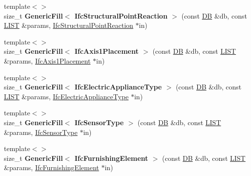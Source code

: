 \begin{DoxyCompactItemize}
\item 
\hypertarget{namespace_assimp_1_1_s_t_e_p_ac2d138adfe91c8481dff5e7fff17ab69}{{\footnotesize template$<$$>$ }\\size\+\_\+t {\bfseries Generic\+Fill$<$ Ifc\+Structural\+Point\+Reaction $>$} (const \hyperlink{class_assimp_1_1_s_t_e_p_1_1_d_b}{D\+B} \&db, const \hyperlink{class_assimp_1_1_s_t_e_p_1_1_e_x_p_r_e_s_s_1_1_l_i_s_t}{L\+I\+S\+T} \&params, \hyperlink{struct_assimp_1_1_i_f_c_1_1_ifc_structural_point_reaction}{Ifc\+Structural\+Point\+Reaction} $\ast$in)}\label{namespace_assimp_1_1_s_t_e_p_ac2d138adfe91c8481dff5e7fff17ab69}

\item 
\hypertarget{namespace_assimp_1_1_s_t_e_p_ad51557042bd1aa5856e1bd68b151a7d5}{{\footnotesize template$<$$>$ }\\size\+\_\+t {\bfseries Generic\+Fill$<$ Ifc\+Axis1\+Placement $>$} (const \hyperlink{class_assimp_1_1_s_t_e_p_1_1_d_b}{D\+B} \&db, const \hyperlink{class_assimp_1_1_s_t_e_p_1_1_e_x_p_r_e_s_s_1_1_l_i_s_t}{L\+I\+S\+T} \&params, \hyperlink{struct_assimp_1_1_i_f_c_1_1_ifc_axis1_placement}{Ifc\+Axis1\+Placement} $\ast$in)}\label{namespace_assimp_1_1_s_t_e_p_ad51557042bd1aa5856e1bd68b151a7d5}

\item 
\hypertarget{namespace_assimp_1_1_s_t_e_p_aefa592f99f3422c9de8582305367f70a}{{\footnotesize template$<$$>$ }\\size\+\_\+t {\bfseries Generic\+Fill$<$ Ifc\+Electric\+Appliance\+Type $>$} (const \hyperlink{class_assimp_1_1_s_t_e_p_1_1_d_b}{D\+B} \&db, const \hyperlink{class_assimp_1_1_s_t_e_p_1_1_e_x_p_r_e_s_s_1_1_l_i_s_t}{L\+I\+S\+T} \&params, \hyperlink{struct_assimp_1_1_i_f_c_1_1_ifc_electric_appliance_type}{Ifc\+Electric\+Appliance\+Type} $\ast$in)}\label{namespace_assimp_1_1_s_t_e_p_aefa592f99f3422c9de8582305367f70a}

\item 
\hypertarget{namespace_assimp_1_1_s_t_e_p_aa62aef9fd90413cedbc8141db9c1255c}{{\footnotesize template$<$$>$ }\\size\+\_\+t {\bfseries Generic\+Fill$<$ Ifc\+Sensor\+Type $>$} (const \hyperlink{class_assimp_1_1_s_t_e_p_1_1_d_b}{D\+B} \&db, const \hyperlink{class_assimp_1_1_s_t_e_p_1_1_e_x_p_r_e_s_s_1_1_l_i_s_t}{L\+I\+S\+T} \&params, \hyperlink{struct_assimp_1_1_i_f_c_1_1_ifc_sensor_type}{Ifc\+Sensor\+Type} $\ast$in)}\label{namespace_assimp_1_1_s_t_e_p_aa62aef9fd90413cedbc8141db9c1255c}

\item 
\hypertarget{namespace_assimp_1_1_s_t_e_p_a10c2ddb2ebf502120709618e5e377385}{{\footnotesize template$<$$>$ }\\size\+\_\+t {\bfseries Generic\+Fill$<$ Ifc\+Furnishing\+Element $>$} (const \hyperlink{class_assimp_1_1_s_t_e_p_1_1_d_b}{D\+B} \&db, const \hyperlink{class_assimp_1_1_s_t_e_p_1_1_e_x_p_r_e_s_s_1_1_l_i_s_t}{L\+I\+S\+T} \&params, \hyperlink{struct_assimp_1_1_i_f_c_1_1_ifc_furnishing_element}{Ifc\+Furnishing\+Element} $\ast$in)}\label{namespace_assimp_1_1_s_t_e_p_a10c2ddb2ebf502120709618e5e377385}


\end{DoxyCompactItemize}

